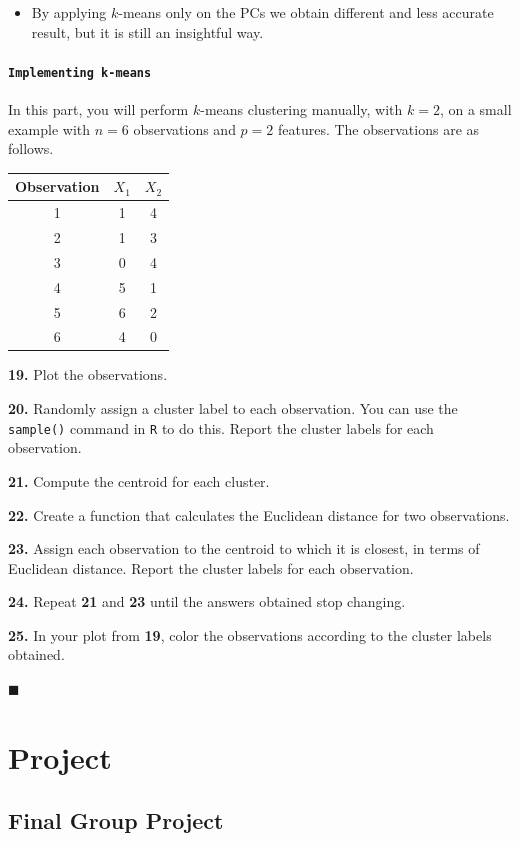 \documentclass[]{book}
\newenvironment{rmdblock}[1]
  {\begin{shaded*}
  \begin{itemize}
  \renewcommand{\labelitemi}{
    \raisebox{-.7\height}[0pt][0pt]{
      {\setkeys{Gin}{width=2em,keepaspectratio}\texttt{[image: img/icons/\#1]}}
    }
  }
  \item
  }
  {
  \end{itemize}
  \end{shaded*}
  }
\newenvironment{rmdinsight}
  {\begin{rmdblock}{insight}}
  {\end{rmdblock}}
\begin{document}
\begin{rmdinsight}
By applying \(k\)-means only on the PCs we obtain different and less
accurate result, but it is still an insightful way.
\end{rmdinsight}

\subsection*{\texorpdfstring{\texttt{Implementing\ k-means}}{Implementing k-means}}\label{implementing-k-means}

In this part, you will perform \(k\)-means clustering manually, with
\(k=2\), on a small example with \(n=6\) observations and \(p=2\)
features. The observations are as follows.

\begin{longtable}[]{@{}ccc@{}}
\toprule
\textbf{Observation} & \textbf{\(X_1\)} &
\textbf{\(X_2\)}\tabularnewline
\midrule
\endhead
1 & 1 & 4\tabularnewline
2 & 1 & 3\tabularnewline
3 & 0 & 4\tabularnewline
4 & 5 & 1\tabularnewline
5 & 6 & 2\tabularnewline
6 & 4 & 0\tabularnewline
\bottomrule
\end{longtable}

\textbf{19.} Plot the observations.

\textbf{20.} Randomly assign a cluster label to each observation. You
can use the \texttt{sample()} command in \texttt{R} to do this. Report
the cluster labels for each observation.

\textbf{21.} Compute the centroid for each cluster.

\textbf{22.} Create a function that calculates the Euclidean distance
for two observations.

\textbf{23.} Assign each observation to the centroid to which it is
closest, in terms of Euclidean distance. Report the cluster labels for
each observation.

\textbf{24.} Repeat \textbf{21} and \textbf{23} until the answers
obtained stop changing.

\textbf{25.} In your plot from \textbf{19}, color the observations
according to the cluster labels obtained.

◼

\part{Project}\label{part-project}

\chapter*{Final Group Project}\label{final-group-project}
\end{document}
